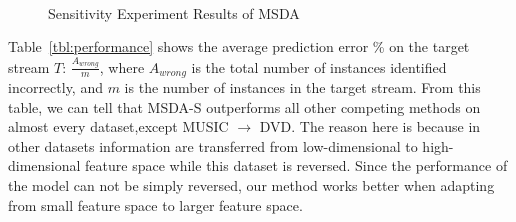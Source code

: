 \begin{figure}[t]
   \centering
    \\
   \caption{Sensitivity Experiment Results of MSDA}
   \label{fig:sensitivity}
\end{figure}


Table~\ref{tbl:performance} shows the average prediction error \% on the target stream $T$: $\frac{A_{wrong}}{m}$, where $A_{wrong}$ is the total number of instances identified incorrectly, and $m$ is the number of instances in the target stream. From this table, we can tell that MSDA-S outperforms all other competing methods on almost every dataset,except MUSIC $\rightarrow$ DVD. The reason here is because in other datasets information are transferred from low-dimensional to high-dimensional feature space while this dataset is reversed. Since the performance of the model can not be simply reversed, our method works better when adapting from small feature space to larger feature space. 

